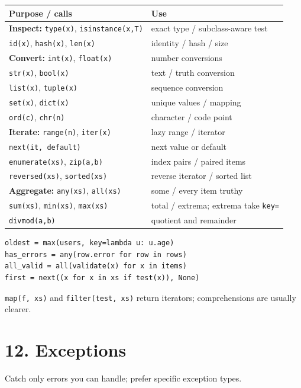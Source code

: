 \documentclass[10pt,a4paper]{article}
\newcommand{\py}[1]{\texttt{#1}}
\newenvironment{tbl}{\par\begin{lrbox}{\tblbox}\begin{minipage}{\linewidth}\compacttable}%
  {\end{minipage}\end{lrbox}\noindent\raisebox{\dp\tblbox}{\usebox{\tblbox}}\par}
\newcommand{\compacttable}{\fontsize{10}{11.2}\selectfont\setlength{\tabcolsep}{2.5pt}\renewcommand{\arraystretch}{1.08}}
\begin{document}
\begin{multicols}{2}
\begin{tbl}
\begin{tabularx}{\linewidth}{@{}R{.40\linewidth}L@{}}
\toprule
\textbf{Purpose / calls} & \textbf{Use} \\
\midrule
\textbf{Inspect:} \py{type(x)}, \py{isinstance(x,T)} & exact type / subclass-aware test \\
\py{id(x)}, \py{hash(x)}, \py{len(x)} & identity / hash / size \\
\textbf{Convert:} \py{int(x)}, \py{float(x)} & number conversions \\
\py{str(x)}, \py{bool(x)} & text / truth conversion \\
\py{list(x)}, \py{tuple(x)} & sequence conversion \\
\py{set(x)}, \py{dict(x)} & unique values / mapping \\
\py{ord(c)}, \py{chr(n)} & character / code point \\
\textbf{Iterate:} \py{range(n)}, \py{iter(x)} & lazy range / iterator \\
\py{next(it, default)} & next value or default \\
\py{enumerate(xs)}, \py{zip(a,b)} & index pairs / paired items \\
\py{reversed(xs)}, \py{sorted(xs)} & reverse iterator / sorted list \\
\textbf{Aggregate:} \py{any(xs)}, \py{all(xs)} & some / every item truthy \\
\py{sum(xs)}, \py{min(xs)}, \py{max(xs)} & total / extrema; extrema take \py{key=} \\
\py{divmod(a,b)} & quotient and remainder \\
\bottomrule
\end{tabularx}
\end{tbl}

\begin{lstlisting}
oldest = max(users, key=lambda u: u.age)
has_errors = any(row.error for row in rows)
all_valid = all(validate(x) for x in items)
first = next((x for x in xs if test(x)), None)
\end{lstlisting}

\py{map(f, xs)} and \py{filter(test, xs)} return iterators; comprehensions are usually clearer.

\section{12. Exceptions}

Catch only errors you can handle; prefer specific exception types.


\end{multicols}
\end{document}

